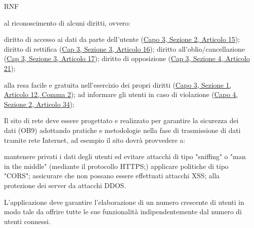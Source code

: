\begin{listaPersonale}{RNF}
\begin{listaPersonale2}{}
         al riconoscimento di alcuni diritti, ovvero:
        \begin{listaPersonale3}{}
             diritto di accesso ai dati da parte dell'utente (\href{https://eur-lex.europa.eu/legal-content/IT/TXT/?uri=uriserv:OJ.L_.2016.119.01.0001.01.ITA&toc=OJ:L:2016:119:TOC#d1e2520-1-1}{Capo 3, Sezione 2, Articolo 15});
             diritto di rettifica (\href{https://eur-lex.europa.eu/legal-content/IT/TXT/?uri=uriserv:OJ.L_.2016.119.01.0001.01.ITA&toc=OJ:L:2016:119:TOC#d1e2606-1-1}{Cap 3, Sezione 3, Articolo 16});
            diritto all'oblio/cancellazione (\href{https://eur-lex.europa.eu/legal-content/IT/TXT/?uri=uriserv:OJ.L_.2016.119.01.0001.01.ITA&toc=OJ:L:2016:119:TOC#d1e2613-1-1}{Cap 3, Sezione 3, Articolo 17});
             diritto di opposizione (\href{https://eur-lex.europa.eu/legal-content/IT/TXT/?uri=uriserv:OJ.L_.2016.119.01.0001.01.ITA&toc=OJ:L:2016:119:TOC#d1e2810-1-1}{Cap 3, Sezione 4, Articolo 21});
        \end{listaPersonale3}

         alla resa facile e gratuita nell'esercizio dei propri diritti (\href{https://eur-lex.europa.eu/legal-content/IT/TXT/?uri=uriserv:OJ.L_.2016.119.01.0001.01.ITA&toc=OJ:L:2016:119:TOC#d1e2189-1-1}{Capo 3, Sezione 1, Articolo 12, Comma 2});
         ad informare gli utenti in caso di violazione (\href{https://eur-lex.europa.eu/legal-content/IT/TXT/?uri=uriserv:OJ.L_.2016.119.01.0001.01.ITA&toc=OJ:L:2016:119:TOC#d1e3497-1-1}{Capo 4, Sezione 2, Articolo 34});
    \end{listaPersonale2}


     Il sito di rete deve essere progettato e realizzato per garantire la sicurezza dei dati (OB9) adottando pratiche e metodologie nella fase di trasmissione di dati tramite rete Internet, ad esempio il sito dovrà provvedere a:
    \begin{listaPersonale2}{}
         mantenere privati i dati degli utenti ed evitare attacchi di tipo "sniffing" o "man in the middle" (mediante il protocollo HTTPS;)
         applicare politiche di tipo "CORS";
         assicurare che non possano essere effettuati attacchi XSS;
         alla protezione dei server da attacchi DDOS.
    \end{listaPersonale2}

     L'applicazione deve garantire l'elaborazione di un numero crescente di utenti in modo tale da offrire tutte le sue funzionalità indipendentemente dal numero di utenti connessi.


\end{listaPersonale}
